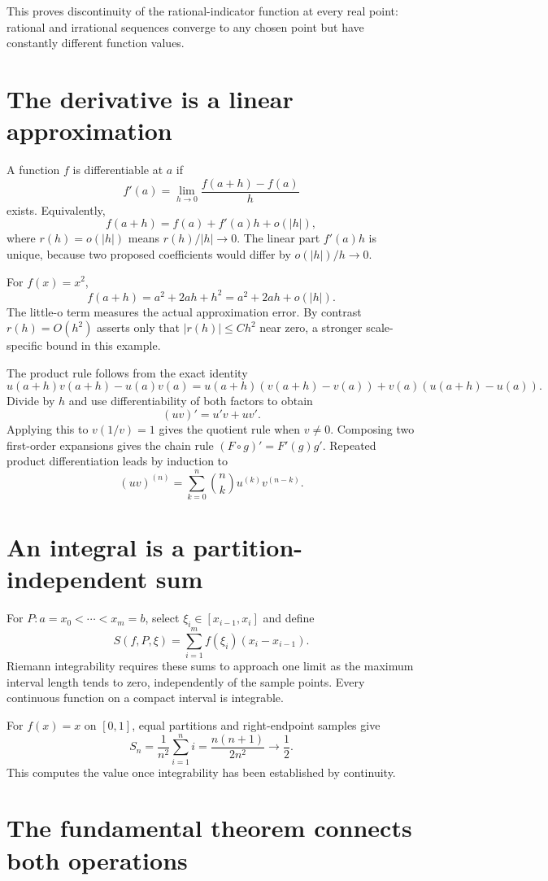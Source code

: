 This proves discontinuity of the rational-indicator function at every real point: rational and irrational sequences converge to any chosen point but have constantly different function values.

\section{The derivative is a linear approximation}

A function \(f\) is differentiable at \(a\) if
\[
 f'(a)=\lim_{h\to0}\frac{f(a+h)-f(a)}h
\]
exists. Equivalently,
\[
 f(a+h)=f(a)+f'(a)h+o(|h|),
\]
where \(r(h)=o(|h|)\) means \(r(h)/|h|\to0\). The linear part \(f'(a)h\) is unique, because two proposed coefficients would differ by \(o(|h|)/h\to0\).

For \(f(x)=x^2\),
\[
 f(a+h)=a^2+2ah+h^2=a^2+2ah+o(|h|).
\]
The little-o term measures the actual approximation error. By contrast \(r(h)=O(h^2)\) asserts only that \(|r(h)|\le Ch^2\) near zero, a stronger scale-specific bound in this example.

The product rule follows from the exact identity
\[
 u(a+h)v(a+h)-u(a)v(a)
 =u(a+h)(v(a+h)-v(a))+v(a)(u(a+h)-u(a)).
\]
Divide by \(h\) and use differentiability of both factors to obtain
\[
 (uv)'=u'v+uv'.
\]
Applying this to \(v(1/v)=1\) gives the quotient rule when \(v\ne0\). Composing two first-order expansions gives the chain rule \((F\circ g)'=F'(g)g'\). Repeated product differentiation leads by induction to
\[
 (uv)^{(n)}=\sum_{k=0}^n\binom nk u^{(k)}v^{(n-k)}.
\]

\section{An integral is a partition-independent sum}

For \(P:a=x_0<\cdots<x_m=b\), select \(\xi_i\in[x_{i-1},x_i]\) and define
\[
 S(f,P,\xi)=\sum_{i=1}^m f(\xi_i)(x_i-x_{i-1}).
\]
Riemann integrability requires these sums to approach one limit as the maximum interval length tends to zero, independently of the sample points. Every continuous function on a compact interval is integrable.

For \(f(x)=x\) on \([0,1]\), equal partitions and right-endpoint samples give
\[
 S_n=\frac1{n^2}\sum_{i=1}^ni
 =\frac{n(n+1)}{2n^2}\to\frac12.
\]
This computes the value once integrability has been established by continuity.

\section{The fundamental theorem connects both operations}

